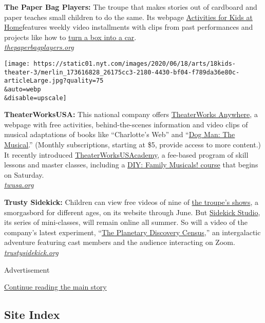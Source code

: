 \textbf{The Paper Bag Players:} The troupe that makes stories out of
cardboard and paper teaches small children to do the same. Its webpage
\href{https://thepaperbagplayers.org/activities-for-kids-at-home/}{Activities
for Kids at Home}features weekly video installments with clips from past
performances and projects like how to
\href{https://www.youtube.com/watch?time_continue=34\&v=yR1Q1pVj6pc\&feature=emb_title}{turn
a box into a car}.\\
\href{https://thepaperbagplayers.org/}{\emph{thepaperbagplayers.org}}

\texttt{[image: https://static01.nyt.com/images/2020/06/18/arts/18kids-theater-3/merlin\_173616828\_26175cc3-2180-4430-bf04-f789da36e80c-articleLarge.jpg?quality=75\\\&auto=webp\\\&disable=upscale]}

\textbf{TheaterWorksUSA:} This national company offers
\href{https://twusa.org/shows-artists/on-tour/anywhere/}{TheaterWorks
Anywhere}, a webpage with free activities, behind-the-scenes information
and video clips of musical adaptations of books like ``Charlotte's Web''
and
``\href{https://www.nytimes.com/2019/07/09/theater/review-dog-man-the-musical.html}{Dog
Man: The Musical}.'' (Monthly subscriptions, starting at \$5, provide
access to more content.) It recently introduced
\href{https://twusa.org/academy/}{TheaterWorksUSAcademy}, a fee-based
program of skill lessons and master classes, including a
\href{https://twusa.org/academy/diy-family-musicals/}{DIY: Family
Musicals! course} that begins on Saturday.\\
\href{https://twusa.org/}{\emph{twusa.org}}

\textbf{Trusty Sidekick:} Children can view free videos of nine of
\href{https://www.trustysidekick.org/the-shows}{the troupe's shows}, a
smorgasbord for different ages, on its website through June. But
\href{https://www.trustysidekick.org/studio}{Sidekick Studio}, its
series of mini-classes, will remain online all summer. So will a video
of the company's latest experiment,
``\href{https://www.trustysidekick.org/planetarycensus-view}{The
Planetary Discovery Census},'' an intergalactic adventure featuring cast
members and the audience interacting on Zoom.\\
\href{https://www.trustysidekick.org/}{\emph{trustysidekick.org}}

Advertisement

\protect\hyperlink{after-bottom}{Continue reading the main story}

\hypertarget{site-index}{%
\subsection{Site Index}\label{site-index}}

